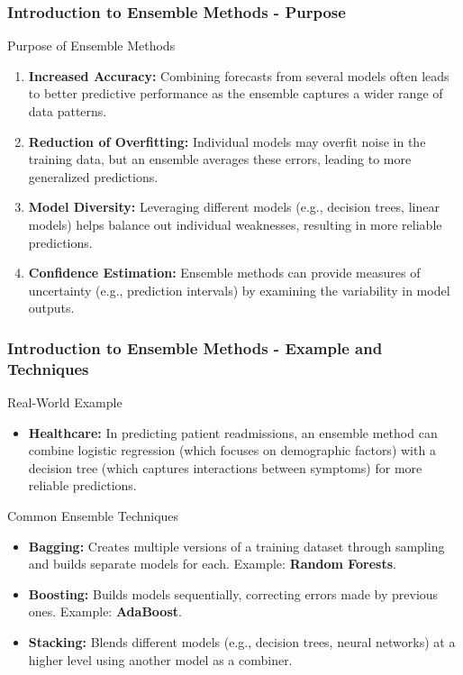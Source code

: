 \documentclass[aspectratio=169]{beamer}
\begin{document}
\begin{frame}[fragile]
  \frametitle{Introduction to Ensemble Methods - Purpose}
  \begin{block}{Purpose of Ensemble Methods}
    \begin{enumerate}
      \item \textbf{Increased Accuracy:} Combining forecasts from several models often leads to better predictive performance as the ensemble captures a wider range of data patterns.
      \item \textbf{Reduction of Overfitting:} Individual models may overfit noise in the training data, but an ensemble averages these errors, leading to more generalized predictions.
      \item \textbf{Model Diversity:} Leveraging different models (e.g., decision trees, linear models) helps balance out individual weaknesses, resulting in more reliable predictions.
      \item \textbf{Confidence Estimation:} Ensemble methods can provide measures of uncertainty (e.g., prediction intervals) by examining the variability in model outputs.
    \end{enumerate}
  \end{block}
\end{frame}

\begin{frame}[fragile]
  \frametitle{Introduction to Ensemble Methods - Example and Techniques}
  \begin{block}{Real-World Example}
    \begin{itemize}
      \item \textbf{Healthcare:} In predicting patient readmissions, an ensemble method can combine logistic regression (which focuses on demographic factors) with a decision tree (which captures interactions between symptoms) for more reliable predictions.
    \end{itemize}
  \end{block}

  \begin{block}{Common Ensemble Techniques}
    \begin{itemize}
      \item \textbf{Bagging:} Creates multiple versions of a training dataset through sampling and builds separate models for each. Example: \textbf{Random Forests}.
      \item \textbf{Boosting:} Builds models sequentially, correcting errors made by previous ones. Example: \textbf{AdaBoost}.
      \item \textbf{Stacking:} Blends different models (e.g., decision trees, neural networks) at a higher level using another model as a combiner.
    \end{itemize}
  \end{block}
\end{frame}
\end{document}
